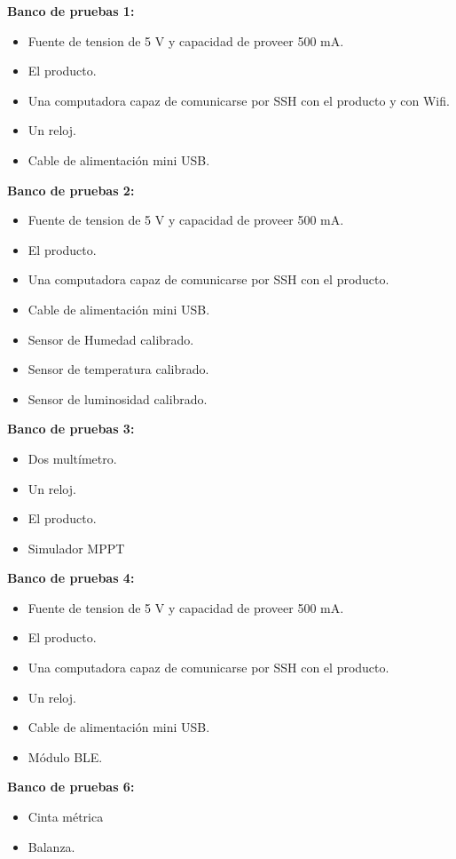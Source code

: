 
\textbf{Banco de pruebas 1:}
\begin{itemize}
	\item Fuente de tension de 5 V y capacidad de proveer 500 mA.
	\item El producto.	
	\item Una computadora capaz de comunicarse por SSH con el producto  y con Wifi.
	\item Un reloj.
	\item Cable de alimentación mini USB.
\end{itemize}

\textbf{Banco de pruebas 2:}
\begin{itemize}
	\item Fuente de tension de 5 V y capacidad de proveer 500 mA.
	\item El producto.	
	\item Una computadora capaz de comunicarse por SSH con el producto.
	\item Cable de alimentación mini USB.
	\item Sensor de Humedad calibrado.
	\item Sensor de temperatura calibrado.
	\item Sensor de luminosidad calibrado.
\end{itemize}

\textbf{Banco de pruebas 3:}
\begin{itemize}
	\item Dos multímetro.
	\item Un reloj.
	\item El producto.
	\item Simulador MPPT
\end{itemize}

\textbf{Banco de pruebas 4:}
\begin{itemize}
	\item Fuente de tension de 5 V y capacidad de proveer 500 mA.
	\item El producto.	
	\item Una computadora capaz de comunicarse por SSH con el producto.
	\item Un reloj.
	\item Cable de alimentación mini USB.
	\item Módulo BLE.
\end{itemize}


\textbf{Banco de pruebas 6:}
\begin{itemize}
	\item Cinta métrica
	\item Balanza.
\end{itemize}